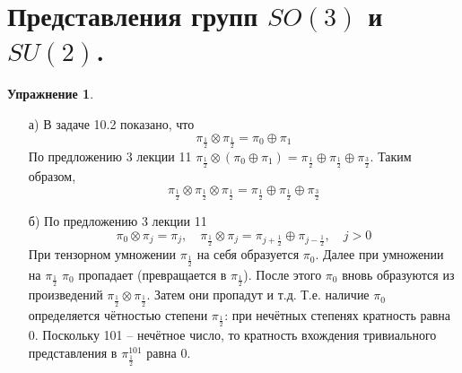 \documentclass[12pt]{article}
\theoremstyle{definition}
\newtheorem{upr}[zad]{Упражнение}
\begin{document}
\section{Представления групп $SO(3)$ и $SU(2)$.}
\begin{upr}
\begin{itemize}
    \item[а)] В задаче 10.2 показано, что
    \begin{equation}
        \pi_\frac{1}{2}\otimes\pi_\frac{1}{2}=\pi_0\oplus \pi_1
    \end{equation}
    По предложению 3 лекции 11 $\pi_\frac{1}{2}\otimes(\pi_0\oplus\pi_1)=\pi_\frac{1}{2}\oplus\pi_\frac{1}{2}\oplus\pi_\frac{3}{2}$. Таким образом,
    \begin{equation}
        \boxed{\pi_\frac{1}{2}\otimes\pi_\frac{1}{2}\otimes\pi_\frac{1}{2}=\pi_\frac{1}{2}\oplus\pi_\frac{1}{2}\oplus\pi_\frac{3}{2}}
    \end{equation}
    \item[б)] По предложению 3 лекции 11
    \begin{equation}
        \pi_0\otimes\pi_j=\pi_j,\quad\pi_\frac{1}{2}\otimes\pi_j=\pi_{j+\frac{1}{2}}\oplus\pi_{j-\frac{1}{2}},\quad j>0
    \end{equation}
    При тензорном умножении $\pi_\frac{1}{2}$ на себя образуется $\pi_0$. Далее при умножении на $\pi_\frac{1}{2}$ $\pi_0$ пропадает (превращается в $\pi_\frac{1}{2}$). После этого $\pi_0$ вновь образуются из произведений $\pi_\frac{1}{2}\otimes\pi_\frac{1}{2}$. Затем они пропадут и т.д. Т.е. наличие $\pi_0$ определяется чётностью степени $\pi_\frac{1}{2}$: при нечётных степенях кратность равна 0. Поскольку 101 -- нечётное число, то кратность вхождения тривиального представления в $\pi^{101}_\frac{1}{2}$ равна 0.
\end{itemize}
\end{upr}
\end{document}
